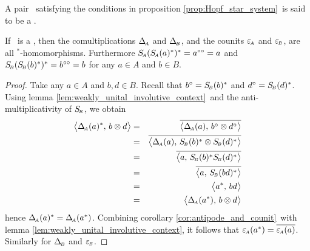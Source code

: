 \begin{defn_sec} \label{def:Hopf_star_system}
A pair \pairAB\ satisfying the conditions in proposition \ref{prop:Hopf_star_system}\
is said to be a {\em \Hss}.
\end{defn_sec}



\begin{prop_sec}
If\/ \pairAB\ is a \Hss, then the comultiplications\/ $\Delta_{\scriptscriptstyle \! A}$ and\/ $\Delta_{\scriptscriptstyle \! B}$,
and the counits\/ $\varepsilon_{\scriptscriptstyle \! A}$ and\/ $\varepsilon_{\scriptscriptstyle \! B}$, are all $^*$-homomorphisms.
Furthermore $S_{\scriptscriptstyle \! A}(S_{\scriptscriptstyle \! A}(a)^*)^* = a^{\circ\circ} = a$ and\/
$S_{\scriptscriptstyle \! B}(S_{\scriptscriptstyle \! B}(b)^*)^* = b^{\circ\circ} = b$ for any\/ $a \in A$ and\/ $b \in B$.
\end{prop_sec}
\begin{proof}
Take any $a \in A$ and $b,d \in B$.
Recall that $b^\circ = S_{\scriptscriptstyle \! B}(b)^*$ and $d^\circ = S_{\scriptscriptstyle \! B}(d)^*$.
Using lemma \ref{lem:weakly_unital_involutive_context}\ and the anti-multiplicativity
of $S_{\scriptscriptstyle \! B}$, we obtain
\begin{eqnarray*}
\pairM{\DeltaA(a)^*}{b \tens d}
&=&
\overline{\pairM{\DeltaA(a)}{b\conj \tens d\conj}}
\\&=&
\overline{\pairM{\DeltaA(a)}{\SB(b)^* \tens  \SB(d)^*}}
\\&=&
\overline{\pairM{a}{\SB(b)^* \SB(d)^*}}
\\&=&
\overline{\pairM{a}{\SB(bd)^*}}
\\&=&
\pairM{a^*}{bd}
\\&=&
\pairM{\DeltaA(a^*)}{b \tens d}
\end{eqnarray*}
hence $\Delta_{\scriptscriptstyle \! A}(a)^* = \Delta_{\scriptscriptstyle \! A}(a^*)$.
Combining corollary \ref{cor:antipode_and_counit}\ with
lemma \ref{lem:weakly_unital_involutive_context}, it follows that
$\varepsilon_{\scriptscriptstyle \! A}(a^*) = \overline{\varepsilon_{\scriptscriptstyle \! A}(a)}$.
Similarly for $\Delta_{\scriptscriptstyle \! B}$ and $\varepsilon_{\scriptscriptstyle \! B}$.
\end{proof}
